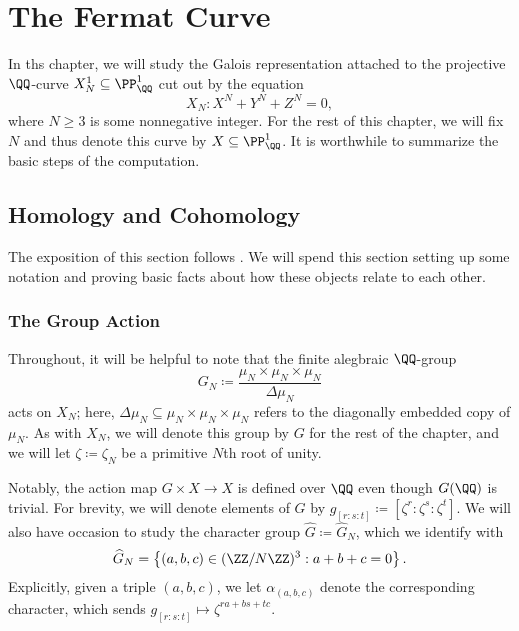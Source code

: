 \documentclass[../thesis.tex]{subfiles}
\begin{document}
\chapter{The Fermat Curve}
In ths chapter, we will study the Galois representation attached to the projective $\QQ$-curve $X^1_N\subseteq\PP^1_\QQ$ cut out by the equation
\[X_N\colon X^N+Y^N+Z^N=0,\]
where $N\ge3$ is some nonnegative integer. %
For the rest of this chapter, we will fix $N$ and thus denote this curve by $X\subseteq\PP^1_\QQ$. It is worthwhile to summarize the basic steps of the computation.\todo{}

\section{Homology and Cohomology}
The exposition of this section follows \cite[Sections~2 and~3]{otsubo-fermat}. We will spend this section setting up some notation and proving basic facts about how these objects relate to each other.

\subsection{The Group Action} \label{subsec:fermat-group-action}
Throughout, it will be helpful to note that the finite alegbraic $\QQ$-group
\[G_N\coloneqq\frac{\mu_N\times\mu_N\times\mu_N}{\Delta\mu_N}\]
acts on $X_N$; here, $\Delta\mu_N\subseteq\mu_N\times\mu_N\times\mu_N$ refers to the diagonally embedded copy of $\mu_N$. As with $X_N$, we will denote this group by $G$ for the rest of the chapter, and we will let $\zeta\coloneqq\zeta_N$ be a primitive $N$th root of unity.

Notably, the action map $G\times X\to X$ is defined over $\QQ$ even though $G(\QQ)$ is trivial. For brevity, we will denote elements of $G$ by $g_{[r:s:t]}\coloneqq\left[\zeta^r:\zeta^s:\zeta^t\right]$. We will also have occasion to study the character group $\widehat G\coloneqq\widehat G_N$, which we identify with
\[\widehat G_N=\left\{(a,b,c)\in(\ZZ/N\ZZ)^3:a+b+c=0\right\}.\]
Explicitly, given a triple $(a,b,c)$, we let $\alpha_{(a,b,c)}$ denote the corresponding character, which sends $g_{[r:s:t]}\mapsto\zeta^{ra+bs+tc}$.
\end{document}
